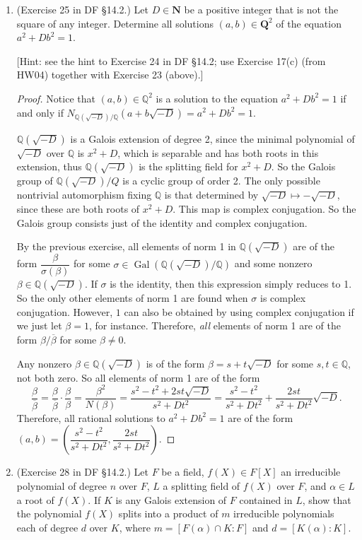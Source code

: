 \documentclass[10pt]{article}
\newcommand{\Q}{\mathbb{Q}}
\DeclareMathOperator*{\Gal}{Gal}
\begin{document}
\begin{enumerate}
\item (Exercise 25 in DF \S 14.2.) Let $D \in \mathbf{N}$ be a positive integer that is not the square of any integer.  Determine all solutions $(a,b) \in \mathbf{Q}^2$ of the equation $a^2+Db^2=1$.

[Hint: see the hint to Exercise 24 in DF \S 14.2; use Exercise 17(c) (from HW04) together with Exercise 23 (above).]

\begin{proof}
Notice that $(a,b) \in \Q^2$ is a solution to the equation $a^2 + Db^2 = 1$ if and only if $N_{\Q(\sqrt{-D})/\Q}(a+b\sqrt{-D}) = a^2 + Db^2 = 1$.

$\Q(\sqrt{-D})$ is a Galois extension of degree 2, since the minimal polynomial of $\sqrt{-D}$ over $\Q$ is $x^2 + D$, which is separable and has both roots in this extension, thus $\Q(\sqrt{-D})$ is the splitting field for $x^2 + D$.  So the Galois group of $\Q(\sqrt{-D}) / Q$ is a cyclic group of order 2.  The only possible nontrivial automorphism fixing $\Q$ is that determined by $\sqrt{-D} \mapsto - \sqrt{-D}$, since these are both roots of $x^2 + D$.  This map is complex conjugation.  So the Galois group consists just of the identity and complex conjugation.

By the previous exercise, all elements of norm 1 in $\Q(\sqrt{-D})$ are of the form $\dfrac{\beta}{\sigma(\beta)}$ for some $\sigma \in \Gal(\Q(\sqrt{-D}) / \Q)$ and some nonzero $\beta \in \Q(\sqrt{-D})$.  If $\sigma$ is the identity, then this expression simply reduces to 1.  So the only other elements of norm 1 are found when $\sigma$ is complex conjugation.  However, $1$ can also be obtained by using complex conjugation if we just let $\beta = 1$, for instance.  Therefore, \emph{all} elements of norm 1 are of the form $\beta / \overline{\beta}$ for some $\beta \neq 0$.

Any nonzero $\beta \in \Q(\sqrt{-D})$ is of the form $\beta = s + t\sqrt{-D}$ for some $s,t \in \Q$, not both zero.  So all elements of norm 1 are of the form
$$
\dfrac{\beta}{\overline{\beta}} = \dfrac{\beta}{\overline{\beta}} \cdot \dfrac{\beta}{\beta} = \dfrac{\beta^2}{N(\beta)} = \dfrac{s^2 - t^2 + 2st\sqrt{-D}}{s^2 + Dt^2} = \dfrac{s^2 - t^2}{s^2 + Dt^2} + \dfrac{2st}{s^2 + Dt^2}\sqrt{-D}.
$$
Therefore, all rational solutions to $a^2 + Db^2 = 1$ are of the form $(a,b) = \left(\dfrac{s^2 - t^2}{s^2 + Dt^2}, \dfrac{2st}{s^2 + Dt^2} \right)$.
\end{proof}

\item (Exercise 28 in DF \S 14.2.) Let $F$ be a field, $f(X) \in F[X]$ an irreducible polynomial of degree $n$ over $F$, $L$ a splitting field of $f(X)$ over $F$, and $\alpha \in L$ a root of $f(X)$.  If $K$ is any Galois extension of $F$ contained in $L$, show that the polynomial $f(X)$ splits into a product of $m$ irreducible polynomials each of degree $d$ over $K$, where $m = [F(\alpha) \cap K: F]$ and $d = [K(\alpha):K]$.


\end{enumerate}
\end{document}
